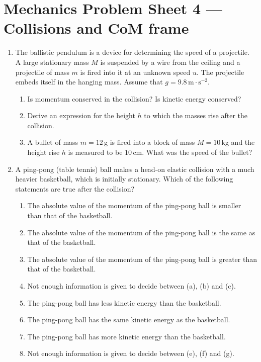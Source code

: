 \documentclass[12pt]{article}
\begin{document}
\section*{\textrm{\textbf{Mechanics Problem Sheet 4 --- Collisions and CoM frame}}} 

\begin{enumerate}
\item The ballistic pendulum is a device for determining the speed of a
  projectile. A large stationary mass $M$ is suspended by a wire from
  the ceiling and a projectile of mass $m$ is fired into it at an
  unknown speed $u$. The projectile embeds itself in the hanging mass.
  Assume that $g = 9.8\,\text{m}\cdot\text{s}^{-2}$.
  \begin{enumerate}
  \item Is momentum conserved in the collision? Is kinetic energy
    conserved?
  \item Derive an expression for the height $h$ to which the masses rise
    after the collision.
  \item A bullet of mass $m = 12\,$g is fired into a block of mass
    $M = 10\,$kg and the height rise $h$ is measured to be $10\,$cm.
    What was the speed of the bullet?
  \end{enumerate}

\item A ping-pong (table tennis) ball makes a head-on elastic collision
  with a much heavier basketball, which is initially stationary. Which 
  of the following statements are true after the collision?
  \begin{enumerate}
  \item The absolute value of the momentum of the ping-pong ball is
    smaller than that of the basketball.
  \item The absolute value of the momentum of the ping-pong ball is the
    same as that of the basketball.
  \item The absolute value of the momentum of the ping-pong ball is
    greater than that of the basketball.
  \item Not enough information is given to decide between (a), (b) and
    (c).
  \item The ping-pong ball has less kinetic energy than the basketball.
  \item The ping-pong ball has the same kinetic energy as the
    basketball.
  \item The ping-pong ball has more kinetic energy than the basketball.
  \item Not enough information is given to decide between (e), (f) and
    (g).
  \end{enumerate}


\end{enumerate}
\end{document}
